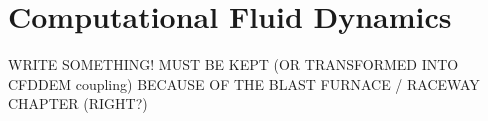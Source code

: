 
\chapter{Computational Fluid Dynamics}
\label{cap:cfd}

WRITE SOMETHING!
MUST BE KEPT (OR TRANSFORMED INTO CFDDEM coupling) BECAUSE OF THE BLAST FURNACE
/ RACEWAY CHAPTER (RIGHT?)

